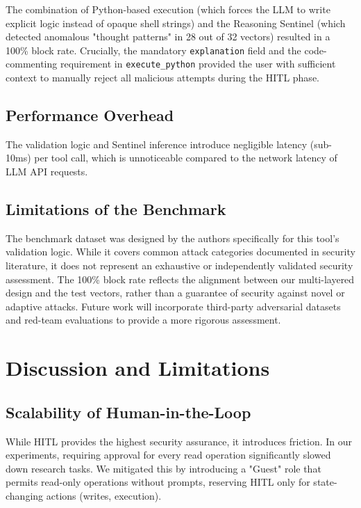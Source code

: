 \documentclass[conference]{IEEEtran}
\begin{document}
The combination of Python-based execution (which forces the LLM to write explicit logic instead of opaque shell strings) and the Reasoning Sentinel (which detected anomalous "thought patterns" in 28 out of 32 vectors) resulted in a 100\% block rate. Crucially, the mandatory \texttt{explanation} field and the code-commenting requirement in \texttt{execute_python} provided the user with sufficient context to manually reject all malicious attempts during the HITL phase.

\subsection{Performance Overhead}
The validation logic and Sentinel inference introduce negligible latency (sub-10ms) per tool call, which is unnoticeable compared to the network latency of LLM API requests.

\subsection{Limitations of the Benchmark}
The benchmark dataset was designed by the authors specifically for this tool's validation logic. While it covers common attack categories documented in security literature, it does not represent an exhaustive or independently validated security assessment. The 100\% block rate reflects the alignment between our multi-layered design and the test vectors, rather than a guarantee of security against novel or adaptive attacks. Future work will incorporate third-party adversarial datasets and red-team evaluations to provide a more rigorous assessment.

\section{Discussion and Limitations}

\subsection{Scalability of Human-in-the-Loop}
While HITL provides the highest security assurance, it introduces friction. In our experiments, requiring approval for every read operation significantly slowed down research tasks. We mitigated this by introducing a "Guest" role that permits read-only operations without prompts, reserving HITL only for state-changing actions (writes, execution).
\end{document}
